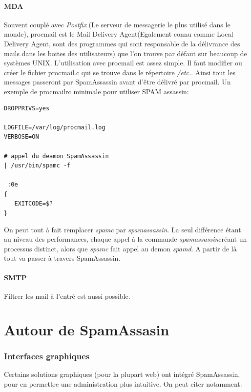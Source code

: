 \documentclass[a4paper,11pt]{article}
\begin{document}
\subsection{MDA}

Souvent couplé avec \emph{Postfix} (Le serveur de messagerie le plus utilisé dans le monde), procmail est le 
Mail Delivery Agent(Egalement connu comme Local Delivery Agent, sont des programmes qui sont responsable
de la délivrance des mails dans les boites des utilisateurs) que l'on trouve par défaut sur beaucoup de systèmes UNIX.
L'utilisation avec procmail est assez simple. Il faut modifier ou créer le fichier procmail.c qui se trouve dans le répertoire \emph{/etc.}.
Ainsi tout les messages passeront par SpamAssassin avant d'être délivré par procmail. 
\linebreak
Un exemple de procmailrc minimale pour utiliser SPAM assassin:
\begin{lstlisting}[frame=single]  
DROPPRIVS=yes

LOGFILE=/var/log/procmail.log
VERBOSE=ON

# appel du deamon SpamAssassin
| /usr/bin/spamc -f

 :0e
{
   EXITCODE=$?
}
\end{lstlisting}
On peut tout à fait remplacer \emph{spamc} par \emph{spamassassin}. La seul différence étant au niveau des performances, 
chaque appel à la commande \emph{spamassassin}créant un processus distinct, alors que \emph{spamc} fait appel au demon \emph{spamd}.
A partir de là tout va passer à travers SpamAssassin.
\pagebreak

\subsection{SMTP}

Filtrer les mail à l'entré est aussi possible. 
        

\part{Autour de SpamAssasin}

\section{Interfaces graphiques}

Certains solutions graphiques (pour la plupart web) ont intégré SpamAssassin, pour en permettre une administration plus intuitive.
On peut citer notamment:
\begin{description}
 \item 
\end{description}
\end{document}
